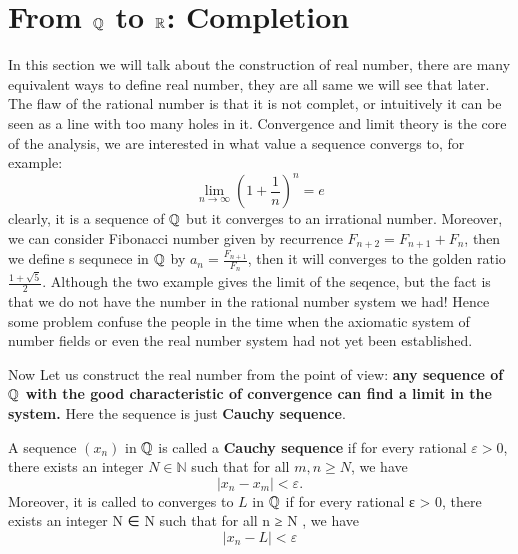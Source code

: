 \documentclass[en,geye,blue,pc,12pt]{elegantnote}
\begin{document}
\section{From \texorpdfstring{$\mathbb{Q}$}{TEXT} to \texorpdfstring{$\mathbb{R}$}{TEXT}: Completion}
In this section we will talk about the construction of real number, there are many equivalent ways to define real number, they are all same we will see that later. The flaw of the rational number is that it is not complet, or intuitively it can be seen as a line with too many holes in it. Convergence and limit theory is the core of the analysis, we are interested in what value a sequence convergs to, for example:
\[\lim_{n \rightarrow \infty} (1+\frac{1}{n})^n =e\]
clearly, it is a sequence of \(\mathbb{Q}\) but it converges to an irrational number. Moreover, we can consider Fibonacci number given by recurrence \(F_{n+2} = F_{n+1} + F_{n}\), then we define s sequnece in \(\mathbb{Q}\) by \(a_n = \frac{F_{n+1}}{F_n}\), then it will converges to the golden ratio \(\frac{1+\sqrt{5}}{2}\).
Although the two example gives the limit of the seqence, but the fact is that we do not have the number in the rational number system we had! Hence some problem confuse the people in the time when the axiomatic system of number fields or even the real number system had not yet been established. 

Now Let us construct the real number from the point of view: \textbf{any sequence of \(\mathbb{Q}\) with the good characteristic of convergence can find a limit in the system.} Here the sequence is just \textbf{Cauchy sequence}.
\begin{definition}
  A sequence \((x_n)\) in \(\mathbb{\mathbb{Q}}\) is called a \textbf{Cauchy sequence} if for every rational \(\varepsilon > 0\), there exists an integer \(N \in \mathbb{N}\) such that for all \(m, n \geq N\), we have
\[
|x_n - x_m| < \varepsilon.
\]
Moreover, it is called to converges to \(L\) in \(\mathbb{Q}\) if for every rational
ε > 0, there exists an integer N ∈ N such that for all  n ≥ N , we have
\[|x_n-L| < \varepsilon\]
\end{definition}
\end{document}
